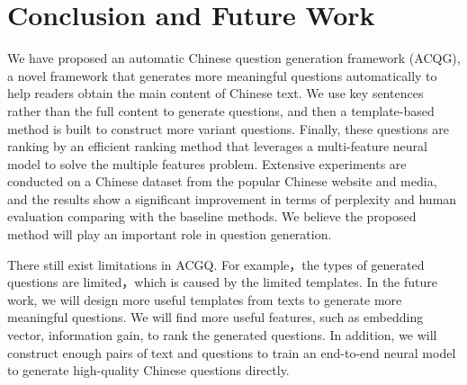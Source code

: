\documentclass[runningheads,UTF8,article]{comsis2}
\newcommand\revised[1]{{\color{black} #1}}
\begin{document}
	
	\section{Conclusion and Future Work}
	We have proposed an automatic Chinese question generation framework (ACQG), a novel framework that generates more meaningful questions automatically to help readers obtain the main content of Chinese text. We use key sentences rather than the full content to generate questions, and then a template-based method is built to construct more variant questions. Finally, these questions are ranking by an efficient ranking method that leverages a multi-feature neural model to solve the multiple features problem. Extensive experiments are conducted on a Chinese dataset from the popular Chinese website and media, and the results show a significant improvement in terms of perplexity and human evaluation comparing with the baseline methods. We believe the proposed method will play an important role in question generation. 
	
	\revised{
		There  still exist limitations in ACGQ. For example，the types of generated questions are limited，which is caused by the limited templates.
		In the future work, we will design more useful templates from texts to generate more meaningful questions. We will find more useful features, such as embedding vector, information gain, to rank the generated questions. In addition, we will construct enough pairs of text and questions to train an end-to-end neural model to generate high-quality Chinese questions directly.}
	
\end{document}
